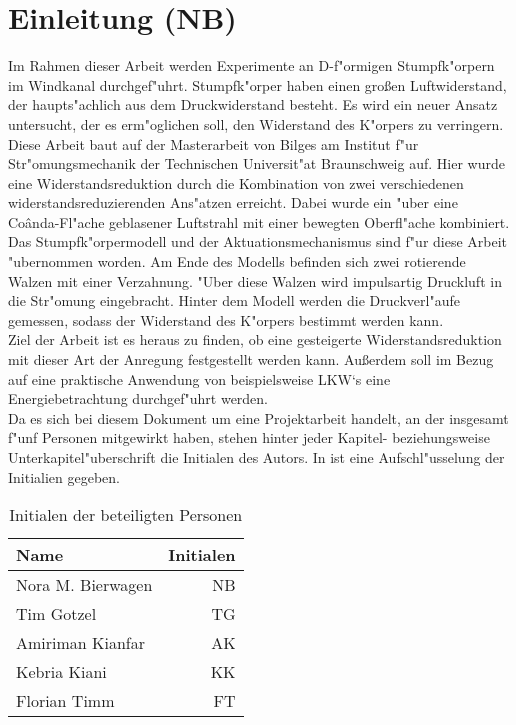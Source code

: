 \chapter{Einleitung (NB)}\label{s:einleitung}
Im Rahmen dieser Arbeit werden Experimente an D-f"ormigen Stumpfk"orpern im Windkanal durchgef"uhrt. Stumpfk"orper haben einen gro\ss{}en Luftwiderstand, der haupts"achlich aus dem Druckwiderstand besteht. Es wird ein neuer Ansatz untersucht, der es erm"oglichen soll, den Widerstand des K"orpers zu verringern.\\
Diese Arbeit baut auf der Masterarbeit von Bilges \cite{Bilges.2018} am Institut f"ur Str"omungsmechanik der Technischen Universit"at Braunschweig auf. Hier wurde eine Widerstandsreduktion durch die Kombination von zwei verschiedenen widerstandsreduzierenden Ans"atzen erreicht. Dabei wurde ein "uber eine Co\^{a}nda-Fl"ache geblasener Luftstrahl mit einer bewegten Oberfl"ache kombiniert. Das Stumpfk"orpermodell und der Aktuationsmechanismus sind f"ur diese Arbeit "ubernommen worden. Am Ende des Modells befinden sich zwei rotierende Walzen mit einer Verzahnung. "Uber diese Walzen wird impulsartig Druckluft in die Str"omung eingebracht. Hinter dem Modell werden die Druckverl"aufe gemessen, sodass der Widerstand des K"orpers bestimmt werden kann.\\
Ziel der Arbeit ist es heraus zu finden, ob eine gesteigerte Widerstandsreduktion mit dieser Art der Anregung festgestellt werden kann. Au\ss{}erdem soll im Bezug auf eine praktische Anwendung von beispielsweise LKW`s eine Energiebetrachtung durchgef"uhrt werden.\\
Da es sich bei diesem Dokument um eine Projektarbeit handelt, an der insgesamt f"unf Personen mitgewirkt haben, stehen hinter jeder Kapitel- beziehungsweise Unterkapitel"uberschrift die Initialen des Autors. In  ist eine Aufschl"usselung der Initialien gegeben.

\begin{table}[h]
	\centering
	\begin{tabular}{lr}
		\toprule
		Name & Initialen\\
		\midrule
		Nora M. Bierwagen & NB\\
		Tim Gotzel & TG\\
		Amiriman Kianfar & AK\\
		Kebria Kiani & KK\\
		Florian Timm & FT\\
		\bottomrule
	\end{tabular}
	\caption{Initialen der beteiligten Personen}
	\label{tab:initialien}
\end{table}
